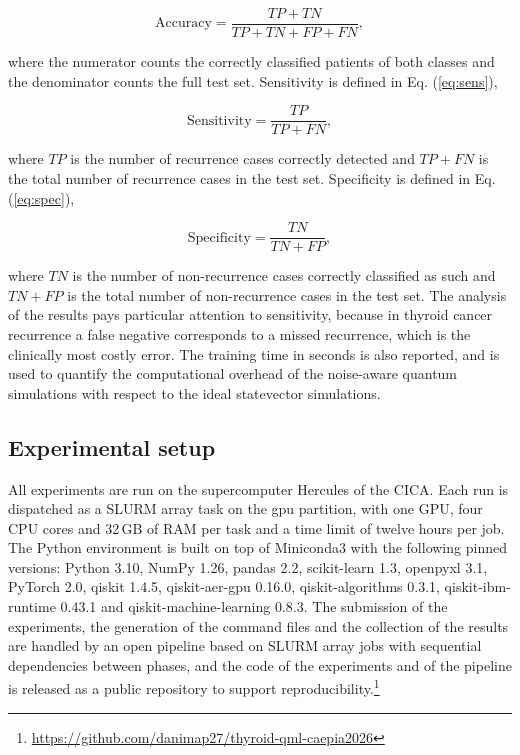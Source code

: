 \begin{equation}
\mathrm{Accuracy} = \frac{TP + TN}{TP + TN + FP + FN},
\label{eq:acc}
\end{equation}

where the numerator counts the correctly classified patients of both classes and the denominator counts the full test set. Sensitivity is defined in Eq. (\ref{eq:sens}),

\begin{equation}
\mathrm{Sensitivity} = \frac{TP}{TP + FN},
\label{eq:sens}
\end{equation}

where $TP$ is the number of recurrence cases correctly detected and $TP + FN$ is the total number of recurrence cases in the test set. Specificity is defined in Eq. (\ref{eq:spec}),

\begin{equation}
\mathrm{Specificity} = \frac{TN}{TN + FP},
\label{eq:spec}
\end{equation}

where $TN$ is the number of non-recurrence cases correctly classified as such and $TN + FP$ is the total number of non-recurrence cases in the test set. The analysis of the results pays particular attention to sensitivity, because in thyroid cancer recurrence a false negative corresponds to a missed recurrence, which is the clinically most costly error. The training time in seconds is also reported, and is used to quantify the computational overhead of the noise-aware quantum simulations with respect to the ideal statevector simulations.

\subsection{Experimental setup}
\label{subsec:setup}

All experiments are run on the supercomputer Hercules of the CICA. Each run is dispatched as a SLURM array task on the gpu partition, with one GPU, four CPU cores and 32\,GB of RAM per task and a time limit of twelve hours per job. The Python environment is built on top of Miniconda3 with the following pinned versions: Python 3.10, NumPy 1.26, pandas 2.2, scikit-learn 1.3, openpyxl 3.1, PyTorch 2.0, qiskit 1.4.5, qiskit-aer-gpu 0.16.0, qiskit-algorithms 0.3.1, qiskit-ibm-runtime 0.43.1 and qiskit-machine-learning 0.8.3. The submission of the experiments, the generation of the command files and the collection of the results are handled by an open pipeline based on SLURM array jobs with sequential dependencies between phases, and the code of the experiments and of the pipeline is released as a public repository to support reproducibility.\footnote{\url{https://github.com/danimap27/thyroid-qml-caepia2026}}

